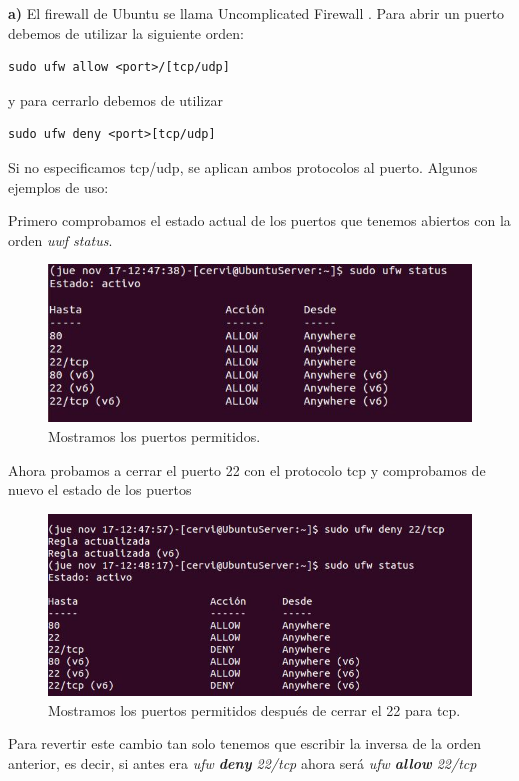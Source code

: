 \textbf{a) } El firewall de Ubuntu se llama Uncomplicated Firewall \cite{ufw}. Para abrir un puerto debemos de utilizar la siguiente orden: \begin{verbatim}sudo ufw allow <port>/[tcp/udp]\end{verbatim} y para cerrarlo debemos de utilizar \begin{verbatim}sudo ufw deny <port>[tcp/udp]\end{verbatim} Si no especificamos tcp/udp, se aplican ambos protocolos al puerto. Algunos ejemplos de uso:\newpage


Primero comprobamos el estado actual de los puertos que tenemos abiertos con la orden \textit{uwf status}.

\begin{figure}[H]
	\centering
	\includegraphics[scale=0.8]{ufw-status-1.jpg}
	\caption{Mostramos los puertos permitidos. \label{fig:figura1}}
\end{figure}

Ahora probamos a cerrar el puerto 22 con el protocolo tcp y comprobamos de nuevo el estado de los puertos
\begin{figure}[H]
	\centering
	\includegraphics[scale=0.75]{ufw-deny-22tcp.jpg}
	\caption{Mostramos los puertos permitidos después de cerrar el 22 para tcp. \label{fig:figura2}}
\end{figure}

Para revertir este cambio tan solo tenemos que escribir la inversa de la orden anterior, es decir, si antes era \textit{ufw \textbf{deny} 22/tcp} ahora será \textit{ufw \textbf{allow} 22/tcp}

